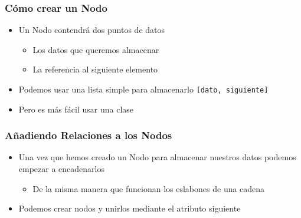 \documentclass[11pt]{beamer}
\begin{document}
	\begin{frame}[fragile]
		\frametitle{Cómo crear un Nodo}
		\begin{itemize}
			\item Un Nodo contendrá dos puntos de datos
			\begin{itemize}
				\item Los datos que queremos almacenar
				\item La referencia al siguiente elemento
			\end{itemize}
			\item Podemos usar una lista simple para almacenarlo \lstinline|[dato, siguiente]|
			\item Pero es más fácil usar una clase
		\end{itemize}
	\end{frame}

	\begin{frame}[fragile]
		\frametitle{Añadiendo Relaciones a los Nodos}
		\begin{itemize}
			\item Una vez que hemos creado un Nodo para almacenar nuestros datos podemos empezar a encadenarlos
			\begin{itemize}
				\item De la misma manera que funcionan los eslabones de una cadena
			\end{itemize}
			\item Podemos crear nodos y unirlos mediante el atributo siguiente
		\end{itemize}
		\vspace{0.5cm}
  		\begin{center}
  		\end{center}
	\end{frame}
\end{document}
